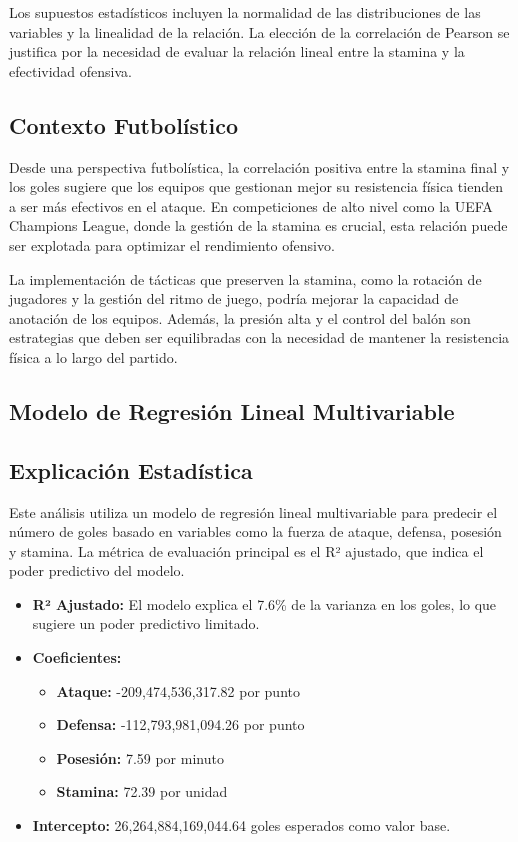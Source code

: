 \documentclass{article}
\begin{document}
            Los supuestos estadísticos incluyen la normalidad de las distribuciones de las variables y la linealidad de la relación. La elección de la correlación de Pearson se justifica por la necesidad de evaluar la relación lineal entre la stamina y la efectividad ofensiva.

            \subsection*{Contexto Futbolístico}
            Desde una perspectiva futbolística, la correlación positiva entre la stamina final y los goles sugiere que los equipos que gestionan mejor su resistencia física tienden a ser más efectivos en el ataque. En competiciones de alto nivel como la UEFA Champions League, donde la gestión de la stamina es crucial, esta relación puede ser explotada para optimizar el rendimiento ofensivo.

            La implementación de tácticas que preserven la stamina, como la rotación de jugadores y la gestión del ritmo de juego, podría mejorar la capacidad de anotación de los equipos. Además, la presión alta y el control del balón son estrategias que deben ser equilibradas con la necesidad de mantener la resistencia física a lo largo del partido.

            \subsection{Modelo de Regresión Lineal Multivariable}
            \subsection*{Explicación Estadística}
            Este análisis utiliza un modelo de regresión lineal multivariable para predecir el número de goles basado en variables como la fuerza de ataque, defensa, posesión y stamina. La métrica de evaluación principal es el R² ajustado, que indica el poder predictivo del modelo.
            
            \begin{itemize}
                \item \textbf{R² Ajustado:} El modelo explica el 7.6\% de la varianza en los goles, lo que sugiere un poder predictivo limitado.
                \item \textbf{Coeficientes:} 
                \begin{itemize}
                    \item \textbf{Ataque:} -209,474,536,317.82 por punto
                    \item \textbf{Defensa:} -112,793,981,094.26 por punto
                    \item \textbf{Posesión:} 7.59 por minuto
                    \item \textbf{Stamina:} 72.39 por unidad
                \end{itemize}
                \item \textbf{Intercepto:} 26,264,884,169,044.64 goles esperados como valor base.
            \end{itemize}
            
\end{document}
